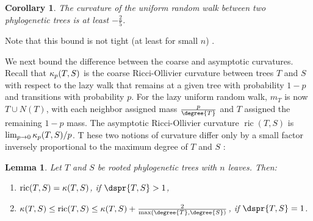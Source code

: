 \documentclass[11pt,onecolumn,conference]{IEEEtran}
\newtheorem{lemma}[theorem]{Lemma}
\newtheorem{corollary}[theorem]{Corollary}
\newcommand{\cuttable}[2][]{%
    \ifthenelse{\equal{#1}{}}%
		{}%
		{#1}%
}
\newcommand{\curvature}[2][]{%
    \ifthenelse{\equal{#1}{}}%
		{\kappa(#2)}%
		{\kappa_{#1}(#2)}%
}
\newcommand{\ric}[1]{
	\operatorname{ric}(#1)%
}
\begin{document}
\begin{corollary}
	The curvature of the uniform random walk between two phylogenetic trees is at least $-\frac{2}{5}$.
\end{corollary}

Note that this bound is not tight (at least for small $n$)\cuttable{ as it is rarely necessary to transport mass the maximum distance between unpaired trees}.
\cuttable{We also note that the lower bounds in this section do not follow from the more general setting described in \cite{Jost2013-ce}.}

We next bound the difference between the coarse and asymptotic curvatures.
Recall that $\curvature[p]{T,S}$ is the coarse Ricci-Ollivier curvature between trees $T$ and $S$ with respect to the lazy walk that remains at a given tree with probability $1-p$ and transitions with probability $p$.
For the lazy uniform random walk, $m_T$ is now $T \cup N(T)$, with each neighbor assigned mass $\frac{p}{\degree{T}}$ and $T$ assigned the remaining $1 - p$ mass.
The asymptotic Ricci-Ollivier curvature $\ric{T,S}$ is $\lim_{p \rightarrow 0} \curvature[p]{T,S} / p$.
\cuttable[T]{As we now prove, t}hese two notions of curvature differ only by a small factor inversely proportional to the maximum degree of $T$ and $S$\cuttable[:]{.}

\begin{lemma}
\label{lem:asymptotic}
	Let $T$ and $S$ be rooted phylogenetic trees with $n$ leaves.
	Then:
	\begin{enumerate}
		\item	$\ric{T,S} = \curvature{T,S}$, if $\dspr{T,S} > 1$,
		\item	$\curvature{T,S} \le \ric{T,S} \le \curvature{T,S} + \frac{2}{\max(\degree{T}, \degree{S})}$, if $\dspr{T,S} = 1$.
	\end{enumerate}
\end{lemma}
\end{document}
